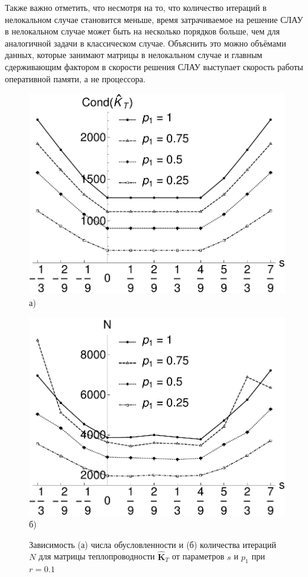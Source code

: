 Также важно отметить, что несмотря на то, что количество итераций в нелокальном случае становится меньше, время затрачиваемое на решение СЛАУ в нелокальном случае может быть на несколько порядков больше, чем для аналогичной задачи в классическом случае. Объяснить это можно объёмами данных, которые занимают матрицы в нелокальном случае и главным сдерживающим фактором в скорости решения СЛАУ выступает скорость работы оперативной памяти, а не процессора.

\begin{figure}[ht]
    \begin{minipage}[b][][b]{0.49\linewidth}\centering
        \includegraphics[width=\linewidth]{pics/ThermalCond.pdf} \\ а)
    \end{minipage}
    \hfill
    \begin{minipage}[b][][b]{0.49\linewidth}\centering
        \includegraphics[width=\linewidth]{pics/ThermalIter.pdf} \\ б)
    \end{minipage}
    \caption{Зависимость (а) числа обусловленности и (б) количества итераций $N$ для матрицы теплопроводности $\widehat{\textbf{K}}_T$ от параметров $s$ и $p_1$ при $r = 0.1$}
    \label{fig:ThermalCondAndIter}
\end{figure}

